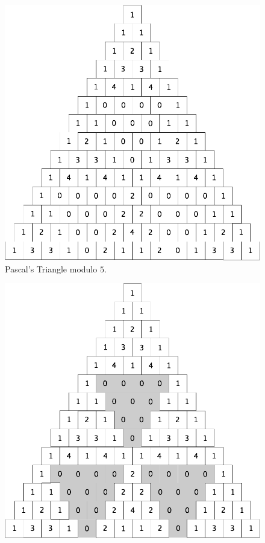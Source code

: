 \begin{enumerate}
{\begin{figure}[ht]
\begin{center}
	\includegraphics[scale=0.2]{FiguresArithmetic/TrianglePascalModulo5init.png}
	        \caption{Pascal's Triangle modulo $5$.}
        \label{fig:TriangleModulo5raw}
\end{center}
\end{figure}
\begin{figure}[ht]
\begin{center}
         \includegraphics[scale=0.2]{FiguresArithmetic/TrianglePascalModulo5.png}

\end{center}
\end{figure}}
\end{enumerate}
